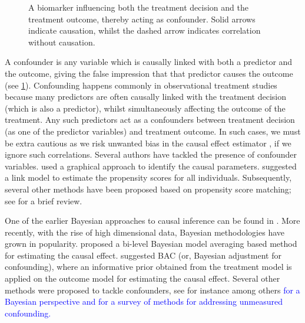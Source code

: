 \documentclass[preprint,12pt]{elsarticle}
\newcommand{\added}[1]{\textcolor{blue}{#1}}
\begin{document}
\begin{figure}
\begin{center}
\end{center}
\caption{A biomarker influencing both the treatment decision and the treatment outcome, thereby acting as confounder. Solid arrows indicate causation, whilst the dashed arrow indicates correlation without causation.}
\label{fig:confounding}
\end{figure}
A confounder is any variable which is causally linked with both a predictor and the outcome, giving the false impression that that predictor causes the outcome (see \cref{fig:confounding}).
Confounding happens commonly in observational treatment studies because many predictors are often causally linked with the treatment decision (which is also a predictor), whilst simultaneously affecting the outcome of the treatment. Any such predictors act as a confounders between treatment decision (as one of the predictor variables) and treatment outcome.
In such cases, we must be extra cautious as we risk
unwanted bias in the causal effect estimator \citep{rosenbaum83},
if we ignore such correlations.
Several authors have tackled the presence of
confounder variables. 
 used a graphical
approach to identify the causal parameters.
 suggested a link model to estimate
the propensity scores for all individuals. Subsequently, several other
methods have been proposed based on propensity score matching;
see \citep{winship99,stuart10} for a brief review.

One of the earlier Bayesian approaches to causal inference
can be found in \citep{rubin1978}. More recently,
with the rise of high dimensional data,
Bayesian methodologies have grown in popularity.
 proposed a bi-level 
Bayesian model averaging based method for estimating the causal 
effect.  suggested BAC (or, Bayesian adjustment for
confounding),
where an informative prior obtained from
the treatment model is applied on the outcome model for
estimating the causal effect. Several other methods were
proposed to tackle confounders,
see for instance \citep{Zigler2014,Hahn2018} among others \added{for
	a Bayesian perspective and
	\citep{zhang_2018} for a survey of methods for addressing unmeasured confounding.}
\end{document}
